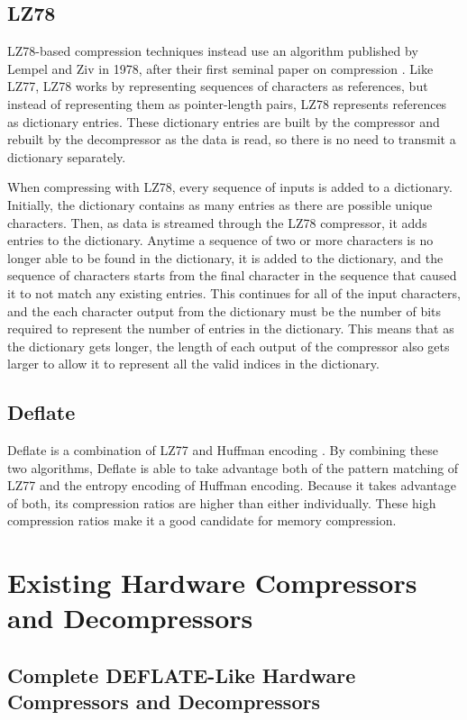 \documentclass[doublespace,draft,nopageskip]{VTthesis} %
\begin{document}
\subsection{LZ78}\label{ss:lz78}
LZ78-based compression techniques instead use an algorithm published by Lempel and Ziv in 1978, after their first seminal paper on compression \cite{lz78}. Like LZ77, LZ78 works by representing sequences of characters as references, but instead of representing them as pointer-length pairs, LZ78 represents references as dictionary entries. These dictionary entries are built by the compressor and rebuilt by the decompressor as the data is read, so there is no need to transmit a dictionary separately.

When compressing with LZ78, every sequence of inputs is added to a dictionary. Initially, the dictionary contains as many entries as there are possible unique characters. Then, as data is streamed through the LZ78 compressor, it adds entries to the dictionary. Anytime a sequence of two or more characters is no longer able to be found in the dictionary, it is added to the dictionary, and the sequence of characters starts from the final character in the sequence that caused it to not match any existing entries. This continues for all of the input characters, and the each character output from the dictionary must be the number of bits required to represent the number of entries in the dictionary. This means that as the dictionary gets longer, the length of each output of the compressor also gets larger to allow it to represent all the valid indices in the dictionary.

\subsection{Deflate}\label{ss:deflate}
Deflate is a combination of LZ77 and Huffman encoding \cite{deflate}. By combining these two algorithms, Deflate is able to take advantage both of the pattern matching of LZ77 and the entropy encoding of Huffman encoding. Because it takes advantage of both, its compression ratios are higher than either individually. These high compression ratios make it a good candidate for memory compression.

\section{Existing Hardware Compressors and Decompressors}\label{se:existing_hardware_compressors_and_decompressors}
\subsection{Complete DEFLATE-Like Hardware Compressors and Decompressors}\label{ss:complete_deflate-like_hardware_compressors_and_decompressors}
\end{document}
